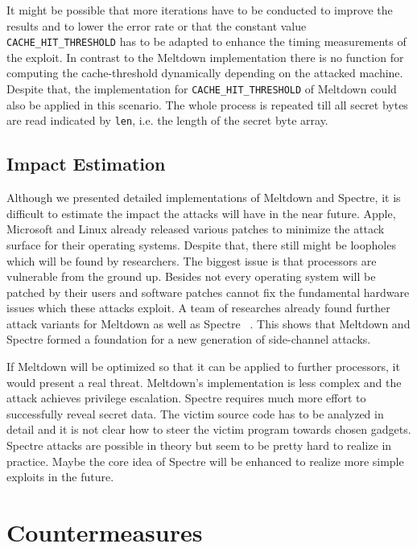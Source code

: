 \documentclass[a4paper,oneside,openright] {scrreprt}
\begin{document}
It might be possible that more iterations have to be conducted to improve the results and to lower the error rate
 or that the constant value \texttt{CACHE\_HIT\_THRESHOLD} has to be adapted to enhance the timing measurements of the exploit.
In contrast to the Meltdown implementation there is no function for computing the cache-threshold dynamically
 depending on the attacked machine.
Despite that, the implementation for \texttt{CACHE\_HIT\_THRESHOLD} of Meltdown could also be applied in this scenario.
The whole process is repeated till all secret bytes are read indicated by \texttt{len}, i.e. the length of the secret byte array.


\section{Impact Estimation}
\label{ch:impactEstimation}

Although we presented detailed implementations of Meltdown and Spectre, it is difficult to estimate the impact
the attacks will have in the near future. Apple, Microsoft and Linux already released various patches to minimize the attack
surface for their operating systems. 
Despite that, there still might be loopholes which will be found by researchers.
The biggest issue is that processors are vulnerable from the ground up. 
Besides not every operating system will be patched by their users and 
software patches cannot fix the fundamental hardware issues which these attacks exploit.
A team of researches already found further attack variants for Meltdown as well as Spectre ~\cite{canella2018systematic}.
This shows that Meltdown and Spectre formed a foundation for a new generation of side-channel attacks.

If Meltdown will be optimized so that it can be applied to further processors, it would present a real threat. 
Meltdown's implementation is less complex and the attack achieves privilege escalation.  
Spectre requires much more effort to successfully reveal secret data.
The victim source code has to be analyzed in detail and it is not clear how to steer the victim program towards chosen gadgets. 
Spectre attacks are possible in theory but seem to be pretty hard to realize in practice.
Maybe the core idea of Spectre will be enhanced to realize more simple exploits in the future.


\chapter{Countermeasures}
\label{ch:countermeasures}
\end{document}
